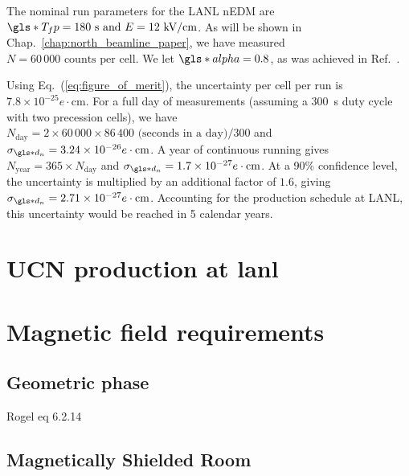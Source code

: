 The nominal run parameters for the LANL nEDM are $\gls*{T_fp}=180\text{ s and } E=12\text{ kV/cm}$. As will be shown in Chap.~\ref{chap:north_beamline_paper}, we have measured $N=60\,000\text{ counts per cell}$. We let $\gls*{alpha}=0.8$, as was achieved in Ref.~\cite{ABE20}.

Using Eq.~(\ref{eq:figure_of_merit}), the uncertainty per cell per run is $7.8 \times 10^{-25}e\cdot\text{cm}$. For a full day of measurements (assuming a \qty{300}{\s} duty cycle with two precession cells), we have $N_\text{day}=2\times60\,000\times86\,400\text{ (seconds in a day)}/300$ and $\sigma_{\gls*{d_n}}=3.24\times10^{-26}e\cdot\text{cm}$. A year of continuous running gives $N_\text{year}=365\times N_\text{day}$ and $\sigma_{\gls*{d_n}}=1.7\times10^{-27}e\cdot\text{cm}$. At a 90\% confidence level, the uncertainty is multiplied by an additional factor of $1.6$, giving $\sigma_{\gls*{d_n}}=2.71\times10^{-27}e\cdot\text{cm}$. Accounting for the production schedule at LANL, this uncertainty would be reached in 5 calendar years.


\section
{
    \texorpdfstring{UCN production at \acrshort{lanl}}
                   {UCN production at LANL}
}



\section
{
    Magnetic field requirements\label{sec:magnetic_field_req}
}




\subsection{Geometric phase}


Rogel eq 6.2.14


\subsection{Magnetically Shielded Room}

